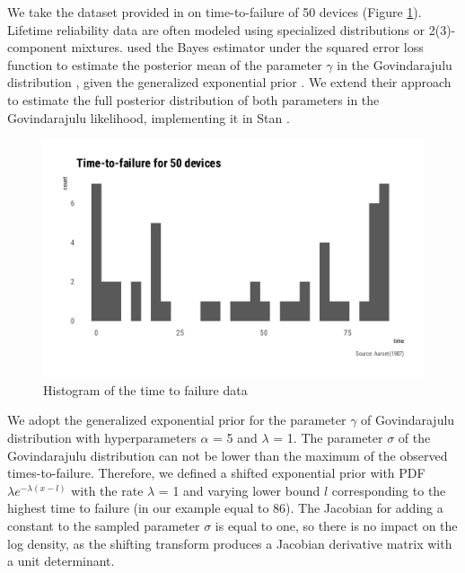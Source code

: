 \documentclass[
  12pt,
]{article}
\begin{document}
We take the dataset provided in \citet{aarset1987HowIdentifyBathtub} on time-to-failure of 50 devices (Figure \ref{fig:bathtub-hist}). Lifetime reliability data are often modeled using specialized distributions \citep{nadarajah2009BathtubshapedFailureRate} or 2(3)-component mixtures. \citet{nair2020BayesianInferenceQuantile} used the Bayes estimator under the squared error loss function to estimate the posterior mean of the parameter \(\gamma\) in the Govindarajulu distribution \citep{nair2012GovindarajuluDistributionProperties}, given the generalized exponential prior \citep{gupta2007GeneralizedExponentialDistribution}. We extend their approach to estimate the full posterior distribution of both parameters in the Govindarajulu likelihood, implementing it in Stan \citep{standevelopmentteam2021RStanInterfaceStan}.

\begin{figure}

{\centering \includegraphics[width=0.8\linewidth]{ilbm_article_files/figure-latex/bathtub-hist-1} 

}

\caption{Histogram of the time to failure data}\label{fig:bathtub-hist}
\end{figure}

We adopt the generalized exponential prior for the parameter \(\gamma\) of Govindarajulu distribution with hyperparameters \(\alpha\) = 5 and \(\lambda\) = 1. The parameter \(\sigma\) of the Govindarajulu distribution can not be lower than the maximum of the observed times-to-failure. Therefore, we defined a shifted exponential prior with PDF \(\lambda e^{-\lambda(x-l)}\) with the rate \(\lambda\) = 1 and varying lower bound \(l\) corresponding to the highest time to failure (in our example equal to 86). The Jacobian for adding a constant to the sampled parameter \(\sigma\) is equal to one, so there is no impact on the log density, as the shifting transform produces a Jacobian derivative matrix with a unit determinant.
\end{document}
